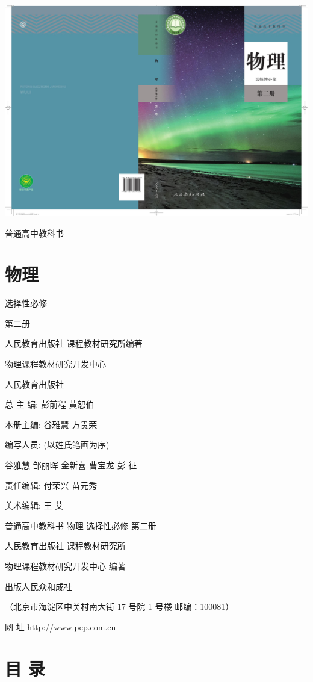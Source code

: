 \documentclass[10pt]{article}
\begin{document}
\begin{center}
\includegraphics[max width=1.0\textwidth]{images/01910e72-c5b7-7ed5-a6d4-fb3a5faefc32_1_100040.jpg}
\end{center}

普通高中教科书

\section*{物理}

选择性必修

第二册

人民教育出版社 课程教材研究所编著

物理课程教材研究开发中心

人民教育出版社

总 主 编: 彭前程 黄恕伯

本册主编: 谷雅慧 方贵荣

编写人员: (以姓氏笔画为序)

谷雅慧 邹丽晖 金新喜 曹宝龙 彭 征

责任编辑: 付荣兴 苗元秀

美术编辑: 王 艾

普通高中教科书 物理 选择性必修 第二册

人民教育出版社 课程教材研究所

物理课程教材研究开发中心 编著

出版人民众和成社

（北京市海淀区中关村南大街 17 号院 1 号楼 邮编：100081）

网 址 http://www.pep.com.cn

\section*{目 录}
\end{document}
